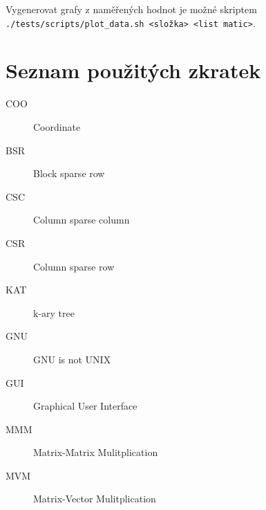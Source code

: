 \documentclass[thesis=B,czech]{FITthesis}[2012/06/26]
\begin{document}
Vygenerovat grafy z naměřených hodnot je možné skriptem \texttt{./tests/scripts/plot\_data.sh <složka> <list matic>}.

\chapter{Seznam použitých zkratek}
\begin{description}
	\item[COO] Coordinate
	\item[BSR] Block sparse row
	\item[CSC] Column sparse column
	\item[CSR] Column sparse row
	\item[KAT] k-ary tree
	\item[GNU] GNU is not UNIX
	\item[GUI] Graphical User Interface
	\item[MMM] Matrix-Matrix Mulitplication
	\item[MVM] Matrix-Vector Mulitplication
\end{description}

\nopagebreak[4]
\nopagebreak[4]

\listoffigures

\nopagebreak[4]
\nopagebreak[4]

\listofalgorithms*

\nopagebreak[4]
\nopagebreak[4]
\end{document}
